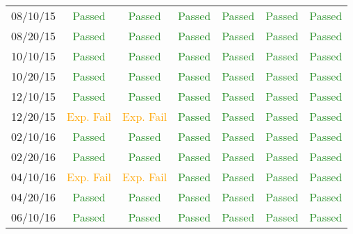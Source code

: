 \begin{table}[htbp]
\begin{tabular}{c | c | c | c | c | c | c}
		08/10/15 & \textcolor{ForestGreen}{Passed} & \textcolor{ForestGreen}{Passed} &  \textcolor{ForestGreen}{Passed}&  \textcolor{ForestGreen}{Passed} & \textcolor{ForestGreen}{Passed} &  \textcolor{ForestGreen}{Passed}\\
		08/20/15 & \textcolor{ForestGreen}{Passed} & \textcolor{ForestGreen}{Passed} &  \textcolor{ForestGreen}{Passed}&  \textcolor{ForestGreen}{Passed} & \textcolor{ForestGreen}{Passed} &  \textcolor{ForestGreen}{Passed}\\
		10/10/15 & \textcolor{ForestGreen}{Passed} & \textcolor{ForestGreen}{Passed} &  \textcolor{ForestGreen}{Passed}&  \textcolor{ForestGreen}{Passed} & \textcolor{ForestGreen}{Passed} &  \textcolor{ForestGreen}{Passed}\\
		10/20/15 & \textcolor{ForestGreen}{Passed} & \textcolor{ForestGreen}{Passed} &  \textcolor{ForestGreen}{Passed}&  \textcolor{ForestGreen}{Passed} & \textcolor{ForestGreen}{Passed} &  \textcolor{ForestGreen}{Passed}\\
		12/10/15 & \textcolor{ForestGreen}{Passed} & \textcolor{ForestGreen}{Passed} &  \textcolor{ForestGreen}{Passed}&  \textcolor{ForestGreen}{Passed} & \textcolor{ForestGreen}{Passed} &  \textcolor{ForestGreen}{Passed}\\
		12/20/15 & \textcolor{orange}{Exp. Fail} & \textcolor{orange}{Exp. Fail} &  \textcolor{ForestGreen}{Passed}&  \textcolor{ForestGreen}{Passed} & \textcolor{ForestGreen}{Passed} &  \textcolor{ForestGreen}{Passed}\\
		02/10/16 & \textcolor{ForestGreen}{Passed} & \textcolor{ForestGreen}{Passed} &  \textcolor{ForestGreen}{Passed}&  \textcolor{ForestGreen}{Passed} & \textcolor{ForestGreen}{Passed} &  \textcolor{ForestGreen}{Passed}\\
		02/20/16 & \textcolor{ForestGreen}{Passed} & \textcolor{ForestGreen}{Passed} &  \textcolor{ForestGreen}{Passed}&  \textcolor{ForestGreen}{Passed} & \textcolor{ForestGreen}{Passed} &  \textcolor{ForestGreen}{Passed}\\
		04/10/16 & \textcolor{orange}{Exp. Fail} & \textcolor{orange}{Exp. Fail} &  \textcolor{ForestGreen}{Passed}&  \textcolor{ForestGreen}{Passed} & \textcolor{ForestGreen}{Passed} &  \textcolor{ForestGreen}{Passed}\\
		04/20/16 & \textcolor{ForestGreen}{Passed} & \textcolor{ForestGreen}{Passed} &  \textcolor{ForestGreen}{Passed}&  \textcolor{ForestGreen}{Passed} & \textcolor{ForestGreen}{Passed} &  \textcolor{ForestGreen}{Passed}\\
		06/10/16 & \textcolor{ForestGreen}{Passed} & \textcolor{ForestGreen}{Passed} &  \textcolor{ForestGreen}{Passed}&  \textcolor{ForestGreen}{Passed} & \textcolor{ForestGreen}{Passed} &  \textcolor{ForestGreen}{Passed}\\

\end{tabular}
\end{table}
